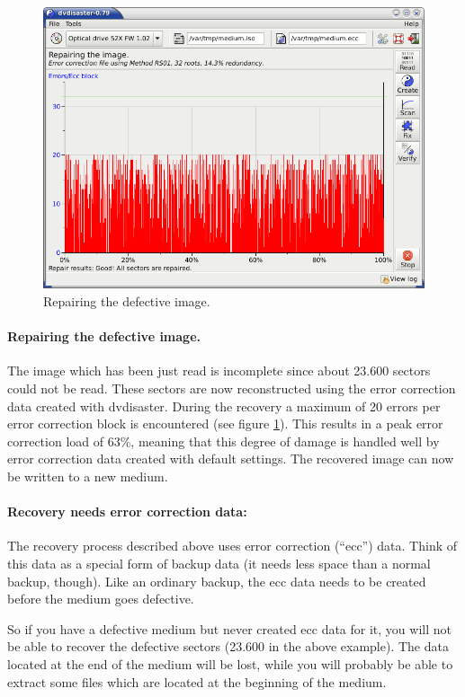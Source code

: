 \begin{figure}[t]
\centerline{\includegraphics[width=\textwidth]{screenshots/fix-image.png}}
\caption{Repairing the defective image.}  
\label{fix-image}
\end{figure}

\paragraph{Repairing the defective image.} 
The image which has been just read is incomplete since about 23.600 sectors could
not be read. These sectors are now reconstructed using the error correction data
created with dvdisaster. During the recovery a maximum of 20 errors per error
correction block is encountered (see figure \ref{fix-image}).
This results in a peak error correction load of
63\%, meaning that this degree of damage is handled well by error correction data
created with default settings. The recovered image can now be written to a new medium.

\paragraph{Recovery needs error correction data:}
The recovery process described above uses error correction (``ecc'') data.
Think of this data as a special form of backup data (it needs less space
than a normal backup, though). Like an ordinary backup, the ecc data needs
to be created before the medium goes defective.

So if you have a defective medium but never created ecc data for it, you will
not be able to recover the defective sectors (23.600 in the above example).
The data located at the end of the medium will be lost, while you will probably
be able to extract some files which are located at the beginning of the medium.
\newpage


